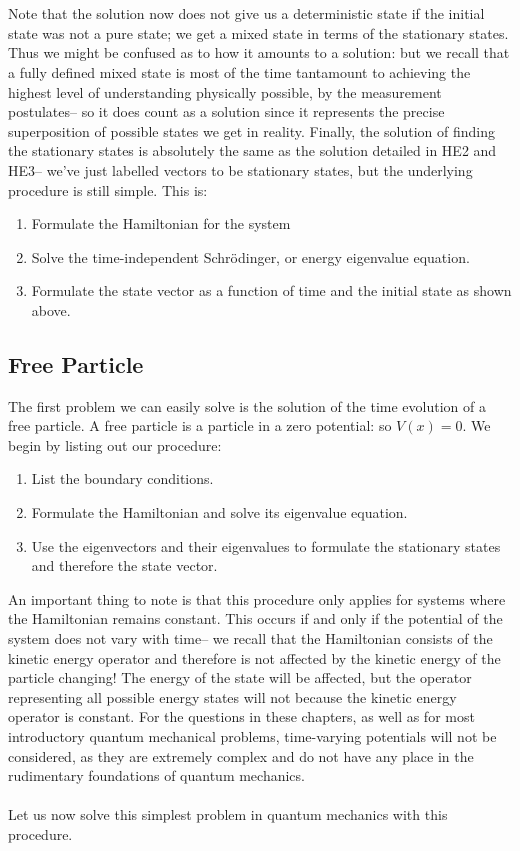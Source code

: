 \begin{enumerate}
    \\\\
    Note that the solution now does not give us a deterministic state if the initial state was not a pure state; we get a mixed state in terms of the stationary states. Thus we might be confused as to how it amounts to a solution: but we recall that a fully defined mixed state is most of the time tantamount to achieving the highest level of understanding physically possible, by the measurement postulates-- so it does count as a solution since it represents the precise superposition of possible states we get in reality. Finally, the solution of finding the stationary states is absolutely the same as the solution detailed in HE2 and HE3-- we've just labelled vectors to be stationary states, but the underlying procedure is still simple. This is:
    \begin{enumerate}
        \item Formulate the Hamiltonian for the system
        \item Solve the time-independent Schr\"{o}dinger, or energy eigenvalue equation.
        \item Formulate the state vector as a function of time and the initial state as shown above.
    \end{enumerate}
\end{enumerate}
\subsection{Free Particle}
The first problem we can easily solve is the solution of the time evolution of a free particle. A free particle is a particle in a zero potential: so $V(x)=0$. We begin by listing out our procedure:
\begin{enumerate}
    \item List the boundary conditions.
    \item Formulate the Hamiltonian and solve its eigenvalue equation.
    \item Use the eigenvectors and their eigenvalues to formulate the stationary states and therefore the state vector.
\end{enumerate}
An important thing to note is that this procedure only applies for systems where the Hamiltonian remains constant. This occurs if and only if the potential of the system does not vary with time-- we recall that the Hamiltonian consists of the kinetic energy operator and therefore is not affected by the kinetic energy of the particle changing! The energy of the state will be affected, but the operator representing all possible energy states will not because the kinetic energy operator is constant. For the questions in these chapters, as well as for most introductory quantum mechanical problems, time-varying potentials will not be considered, as they are extremely complex and do not have any place in the rudimentary foundations of quantum mechanics.
\\\\
Let us now solve this simplest problem in quantum mechanics with this procedure.
